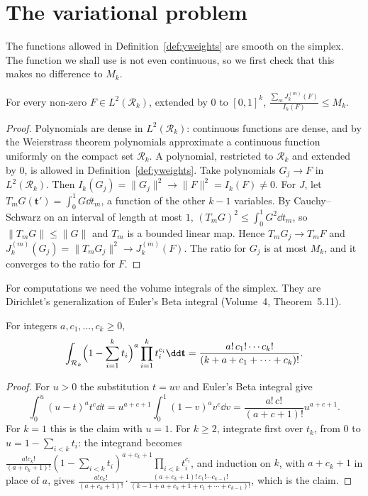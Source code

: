 \section{The variational problem}

The functions allowed in Definition~\ref{def:yweights} are smooth on the simplex. The function we shall use is not even continuous, so we first check that this makes no difference to $M_k$.

\begin{lemma}\label{lem:ltwo}
For every non-zero $F\in L^2(\mathcal R_k)$, extended by $0$ to $[0,1]^k$, $\frac{\sum_mJ_k^{(m)}(F)}{I_k(F)}\le M_k$.
\end{lemma}
\begin{proof}
Polynomials are dense in $L^2(\mathcal R_k)$: continuous functions are dense, and by the Weierstrass theorem polynomials approximate a continuous function uniformly on the compact set $\mathcal R_k$. A polynomial, restricted to $\mathcal R_k$ and extended by $0$, is allowed in Definition~\ref{def:yweights}. Take polynomials $G_j\to F$ in $L^2(\mathcal R_k)$. Then $I_k(G_j)=\|G_j\|^2\to\|F\|^2=I_k(F)\ne0$. For $J$, let $T_mG(\mathbf t')=\int_0^1G\dd t_m$, a function of the other $k-1$ variables. By Cauchy--Schwarz on an interval of length at most $1$, $(T_mG)^2\le\int_0^1G^2\dd t_m$, so $\|T_mG\|\le\|G\|$ and $T_m$ is a bounded linear map. Hence $T_mG_j\to T_mF$ and $J_k^{(m)}(G_j)=\|T_mG_j\|^2\to J_k^{(m)}(F)$. The ratio for $G_j$ is at most $M_k$, and it converges to the ratio for $F$.
\end{proof}

For computations we need the volume integrals of the simplex. They are Dirichlet's generalization of Euler's Beta integral (Volume~4, Theorem~5.11).

\begin{lemma}[Dirichlet]\label{lem:dirichletint}
For integers $a,c_1,\dots,c_k\ge0$,
\[
\int_{\mathcal R_k}\Bigl(1-\sum_{i=1}^kt_i\Bigr)^a\prod_{i=1}^kt_i^{c_i}\dd\mathbf t=\frac{a!\,c_1!\cdots c_k!}{(k+a+c_1+\cdots+c_k)!}.
\]
\end{lemma}
\begin{proof}
For $u>0$ the substitution $t=uv$ and Euler's Beta integral give
\[
\int_0^u(u-t)^at^c\dd t=u^{a+c+1}\int_0^1(1-v)^av^c\dd v=\frac{a!\,c!}{(a+c+1)!}u^{a+c+1}.
\]
For $k=1$ this is the claim with $u=1$. For $k\ge2$, integrate first over $t_k$, from $0$ to $u=1-\sum_{i<k}t_i$: the integrand becomes $\frac{a!c_k!}{(a+c_k+1)!}(1-\sum_{i<k}t_i)^{a+c_k+1}\prod_{i<k}t_i^{c_i}$, and induction on $k$, with $a+c_k+1$ in place of $a$, gives $\frac{a!c_k!}{(a+c_k+1)!}\cdot\frac{(a+c_k+1)!\,c_1!\cdots c_{k-1}!}{(k-1+a+c_k+1+c_1+\cdots+c_{k-1})!}$, which is the claim.
\end{proof}

